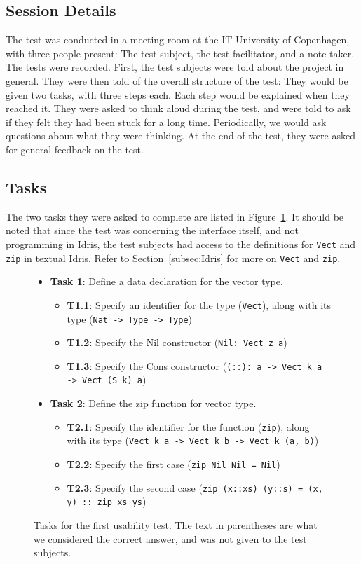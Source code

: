 \subsection{Session Details}
The test was conducted in a meeting room at the IT University of Copenhagen, with three
people present: The test subject, the test facilitator, and a note taker. The
tests were recorded. First, the test subjects were told about the project in
general. They were then told of the overall structure of the test: They would
be given two tasks, with three steps each. Each step would be explained when
they reached it. They were asked to think aloud during the test, and were told to
ask if they felt they had been stuck for a long time. Periodically, we would
ask questions about what they were thinking. At the end of the test, they were asked for general feedback on the test.

\subsection{Tasks}
The two tasks they were asked to complete are listed in Figure~\ref{figure:first_tasks}.
It should be noted that since the test was concerning the interface itself, and
not programming in Idris, the test subjects had access to the definitions for \texttt{Vect} and \texttt{zip} in textual Idris. Refer to Section~\ref{subsec:Idris}
for more on \texttt{Vect} and \texttt{zip}.

\begin{figure}
\centering
\begin{itemize}
	\item \textbf{Task 1}: Define a data declaration for the vector type.
	\begin{itemize}
		\item \textbf{T1.1}: Specify an identifier for the type (\texttt{Vect}), along with its type (\texttt{Nat -> Type -> Type})
		\item \textbf{T1.2}: Specify the Nil constructor (\texttt{Nil: Vect z a})
		\item \textbf{T1.3}: Specify the Cons constructor (\texttt{(::): a -> Vect k a -> Vect (S k) a})
	\end{itemize}
	\item \textbf{Task 2}: Define the zip function for vector type.
	\begin{itemize}
		\item \textbf{T2.1}: Specify the identifier for the function (\texttt{zip}), along with its type (\texttt{Vect k a -> Vect k b -> Vect k (a, b)})
		\item \textbf{T2.2}: Specify the first case (\texttt{zip Nil Nil = Nil})
		\item \textbf{T2.3}: Specify the second case (\texttt{zip (x::xs) (y::s) = (x, y) :: zip xs ys})
	\end{itemize}
\end{itemize}
\caption{Tasks for the first usability test. The text in parentheses are what we considered the correct answer, and was not given to the test subjects.}
\label{figure:first_tasks}
\end{figure}

